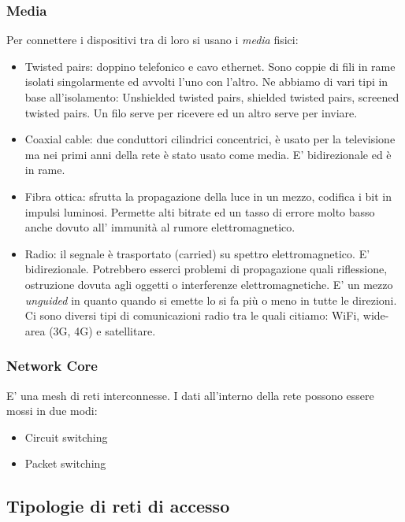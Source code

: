 \subsubsection{Media}
Per connettere i dispositivi tra di loro si usano i \emph{media} fisici:
\begin{itemize}
    \item Twisted pairs: doppino telefonico e cavo ethernet. Sono coppie di fili in rame isolati singolarmente ed avvolti l'uno con l'altro. Ne abbiamo di vari tipi in base all'isolamento: Unshielded twisted pairs, shielded twisted pairs, screened twisted pairs. Un filo serve per ricevere ed un altro serve per inviare.
    
    \item Coaxial cable: due conduttori cilindrici concentrici, è usato per la televisione ma nei primi anni della rete è stato usato come media. E' bidirezionale ed è in rame.
    
    \item Fibra ottica: sfrutta la propagazione della luce in un mezzo, codifica i bit in impulsi luminosi. Permette alti bitrate ed un tasso di errore molto basso anche dovuto all' immunità al rumore elettromagnetico.
    
    \item Radio: il segnale è trasportato (carried) su spettro elettromagnetico. E' bidirezionale. Potrebbero esserci problemi di propagazione quali riflessione, ostruzione dovuta agli oggetti o interferenze elettromagnetiche.
    E' un mezzo \emph{unguided} in quanto quando si emette lo si fa più o meno in tutte le direzioni. Ci sono diversi tipi di comunicazioni radio tra le quali citiamo: WiFi, wide-area (3G, 4G) e satellitare.
\end{itemize}

\subsubsection{Network Core}
E' una mesh di reti interconnesse. I dati all'interno della rete possono essere mossi in due modi:
\begin{itemize}
    \item Circuit switching
    \item Packet switching
\end{itemize}

\subsection{Tipologie di reti di accesso}

